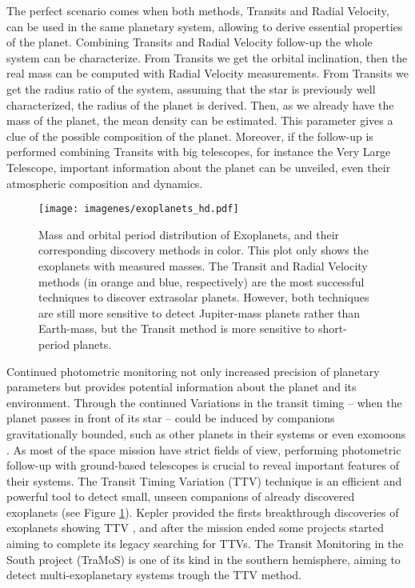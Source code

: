 The perfect scenario comes when both methods, Transits and Radial Velocity, can be used in the same planetary system, allowing to derive essential properties of the planet. Combining Transits and Radial Velocity follow-up the whole system can be characterize. From Transits we get the orbital inclination, then the real mass can be computed with Radial Velocity measurements. From Transits we get the radius ratio of the system, assuming that the star is previously well characterized, the radius of the planet is derived. Then, as we already have the mass of the planet, the mean density can be estimated. This parameter gives a clue of the possible composition of the planet. Moreover, if the follow-up is performed combining Transits with big telescopes, for instance the Very Large Telescope, important information about the planet can be unveiled, even their atmospheric composition and dynamics.

\begin{figure}[t]
\centering
\texttt{[image: imagenes/exoplanets\_hd.pdf]}
\caption{Mass and orbital period distribution of Exoplanets, and their corresponding discovery methods in color. This plot only shows the exoplanets with measured masses. The Transit and Radial Velocity methods (in orange and blue, respectively) are the most successful techniques to discover extrasolar planets. However, both techniques are still more sensitive to detect Jupiter-mass planets rather than Earth-mass, but the Transit method is more sensitive to short-period planets.}
\label{exoplanets}
\end{figure}



Continued photometric monitoring not only increased precision of planetary parameters but provides potential information about the planet and its environment. Through the continued 
 Variations in the transit timing -- when the planet passes in front of its star -- could be induced by companions gravitationally bounded, such as other planets in their systems or even exomoons \citep{Kipping2009a,Kipping2009b}. As most of the space mission have strict fields of view, performing photometric follow-up with ground-based telescopes is crucial to reveal important features of their systems. The Transit Timing Variation (TTV) technique \citep{Holman2005,Agol2005} is an efficient and powerful tool to detect small, unseen companions of already discovered exoplanets (see Figure \ref{exoplanets}). Kepler provided the firsts breakthrough discoveries of exoplanets showing TTV \citep{Holman2010}, and after the mission ended some projects started aiming to complete its legacy searching for TTVs. The Transit Monitoring in the South project (TraMoS) is one of its kind in the southern hemisphere, aiming to detect multi-exoplanetary systems trough the TTV method.  


